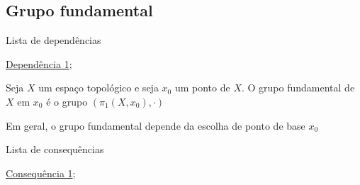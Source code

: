 \subsection{Grupo fundamental}
\label{grupo-fundamental-def}
\begin{titlemize}{Lista de dependências}
	\item \hyperref[produto-bem-definido-prop]{Dependência 1};\\ %
\end{titlemize}
\begin{defi}
	Seja $X$ um espaço topológico e seja $x_0$ um ponto de $X.$ O grupo fundamental de $X$ em $x_0$ é o grupo $(\pi_1(X,x_0),\cdot)$
\end{defi}

Em geral, o grupo fundamental depende da escolha de ponto de base $x_0$

\begin{titlemize}{Lista de consequências}
	\item \hyperref[consequencia1]{Consequência 1};\\ %
	\item \hyperref[]{}
\end{titlemize}
